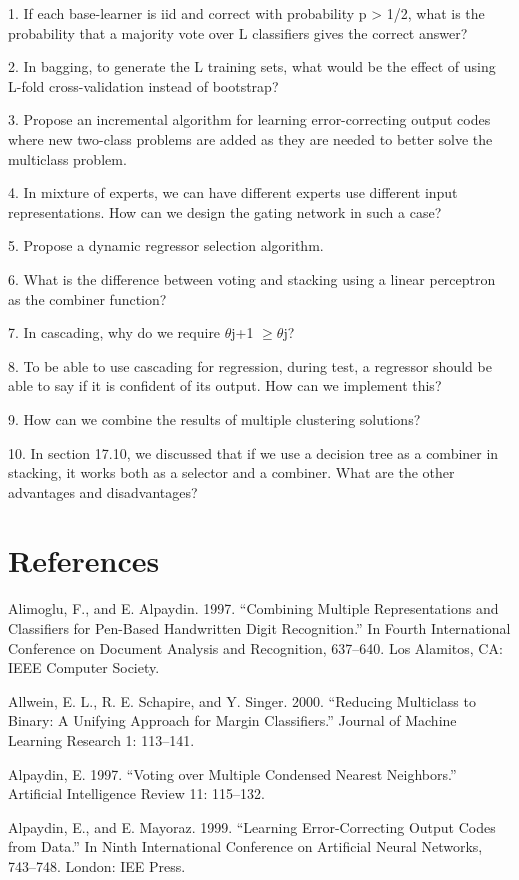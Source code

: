 1. If each base-learner is iid and correct with probability p > 1/2, what is the probability that a majority vote over L classifiers gives the correct answer?

2. In bagging, to generate the L training sets, what would be the effect of using L-fold cross-validation instead of bootstrap?

3. Propose an incremental algorithm for learning error-correcting output codes where new two-class problems are added as they are needed to better solve the multiclass problem.

4. In mixture of experts, we can have different experts use different input representations. How can we design the gating network in such a case?

5. Propose a dynamic regressor selection algorithm.

6. What is the difference between voting and stacking using a linear perceptron as the combiner function?

7. In cascading, why do we require $\theta$j+1 $\geq$$\theta$j?

8. To be able to use cascading for regression, during test, a regressor should be able to say if it is confident of its output. How can we implement this?

9. How can we combine the results of multiple clustering solutions?

10. In section 17.10, we discussed that if we use a decision tree as a combiner in stacking, it works both as a selector and a combiner. What are the other advantages and disadvantages?

\section{References}

Alimoglu, F., and E. Alpaydin. 1997. “Combining Multiple Representations and Classifiers for Pen-Based Handwritten Digit Recognition.” In Fourth International Conference on Document Analysis and Recognition, 637--640. Los Alamitos, CA: IEEE Computer Society.

Allwein, E. L., R. E. Schapire, and Y. Singer. 2000. “Reducing Multiclass to Binary: A Unifying Approach for Margin Classifiers.” Journal of Machine Learning Research 1: 113--141.

Alpaydin, E. 1997. “Voting over Multiple Condensed Nearest Neighbors.” Artificial Intelligence Review 11: 115--132.

Alpaydin, E., and E. Mayoraz. 1999. “Learning Error-Correcting Output Codes from Data.” In Ninth International Conference on Artificial Neural Networks, 743--748. London: IEE Press.

